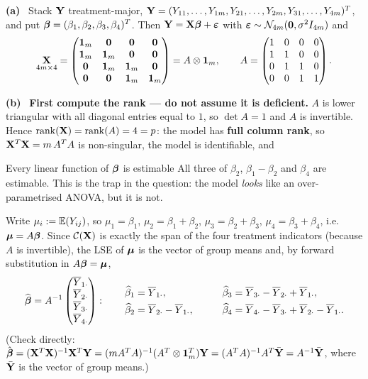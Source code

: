 \documentclass[11pt]{article}
\newcommand{\wh}[1]{\widehat{#1}}
\newcounter{qq}[section]
\newcommand{\pt}[1]{\smallskip\noindent\textbf{(#1)}\ }
\begin{document}
\pt{a} Stack $\mathbf{Y}$ treatment-major,
$\mathbf{Y}=(Y_{11},\dots,Y_{1m},Y_{21},\dots,Y_{2m},Y_{31},\dots,Y_{4m})^T$, and put
$\boldsymbol{\beta}=(\beta_1,\beta_2,\beta_3,\beta_4)^T$. Then $\mathbf{Y}=\mathbf{X}\boldsymbol{\beta}+\boldsymbol{\varepsilon}$ with
$\boldsymbol{\varepsilon}\sim\mathcal{N}_{4m}(\mathbf{0},\sigma^2I_{4m})$ and
\[
  \underset{4m\times4}{\mathbf{X}}=
  \begin{pmatrix}
    \mathbf{1}_m & \mathbf{0} & \mathbf{0} & \mathbf{0}\\
    \mathbf{1}_m & \mathbf{1}_m & \mathbf{0} & \mathbf{0}\\
    \mathbf{0} & \mathbf{1}_m & \mathbf{1}_m & \mathbf{0}\\
    \mathbf{0} & \mathbf{0} & \mathbf{1}_m & \mathbf{1}_m
  \end{pmatrix}
  = A\otimes\mathbf{1}_m,
  \qquad
  A=\begin{pmatrix}1&0&0&0\\1&1&0&0\\0&1&1&0\\0&0&1&1\end{pmatrix}.
\]

\pt{b} \textbf{First compute the rank --- do not assume it is deficient.} $A$ is lower
triangular with all diagonal entries equal to $1$, so $\det A=1$ and $A$ is invertible.
Hence $\operatorname{rank}(\mathbf{X})=\operatorname{rank}(A)=4=p$: the model has \textbf{full column rank}, so
$\mathbf{X}^T\mathbf{X}=m\,A^TA$ is non-singular, the model is identifiable, and

\begin{idea}{Every linear function of $\boldsymbol{\beta}$ is estimable}
All three of $\beta_2$, $\beta_1-\beta_2$ and $\beta_4$ are estimable. This is the trap in
the question: the model \emph{looks} like an over-parametrised ANOVA, but it is not.
\end{idea}

Write $\mu_i:=\mathbb{E}(Y_{ij})$, so $\mu_1=\beta_1$, $\mu_2=\beta_1+\beta_2$,
$\mu_3=\beta_2+\beta_3$, $\mu_4=\beta_3+\beta_4$, i.e.\ $\boldsymbol{\mu}=A\boldsymbol{\beta}$. Since
$\mathcal{C}(\mathbf{X})$ is exactly the span of the four treatment indicators (because $A$ is
invertible), the LSE of $\boldsymbol{\mu}$ is the vector of group means and, by forward substitution in
$A\boldsymbol{\beta}=\boldsymbol{\mu}$,
\[
  \wh\bb=A^{-1}\begin{pmatrix}\Ybar_{1\cdot}\\ \Ybar_{2\cdot}\\ \Ybar_{3\cdot}\\ \Ybar_{4\cdot}\end{pmatrix}:
  \qquad
  \begin{aligned}
    \wh\beta_1&=\Ybar_{1\cdot}, &\qquad \wh\beta_3&=\Ybar_{3\cdot}-\Ybar_{2\cdot}+\Ybar_{1\cdot},\\
    \wh\beta_2&=\Ybar_{2\cdot}-\Ybar_{1\cdot}, &\qquad \wh\beta_4&=\Ybar_{4\cdot}-\Ybar_{3\cdot}+\Ybar_{2\cdot}-\Ybar_{1\cdot}.
  \end{aligned}
\]
(Check directly: $\hat{\boldsymbol{\beta}}=(\mathbf{X}^T\mathbf{X})^{-1}\mathbf{X}^T\mathbf{Y}=(mA^TA)^{-1}(A^T\otimes\mathbf{1}_m^T)\mathbf{Y}
=(A^TA)^{-1}A^T\bar{\mathbf{Y}}=A^{-1}\bar{\mathbf{Y}}$, where $\bar{\mathbf{Y}}$ is the vector of group means.)
\end{document}
